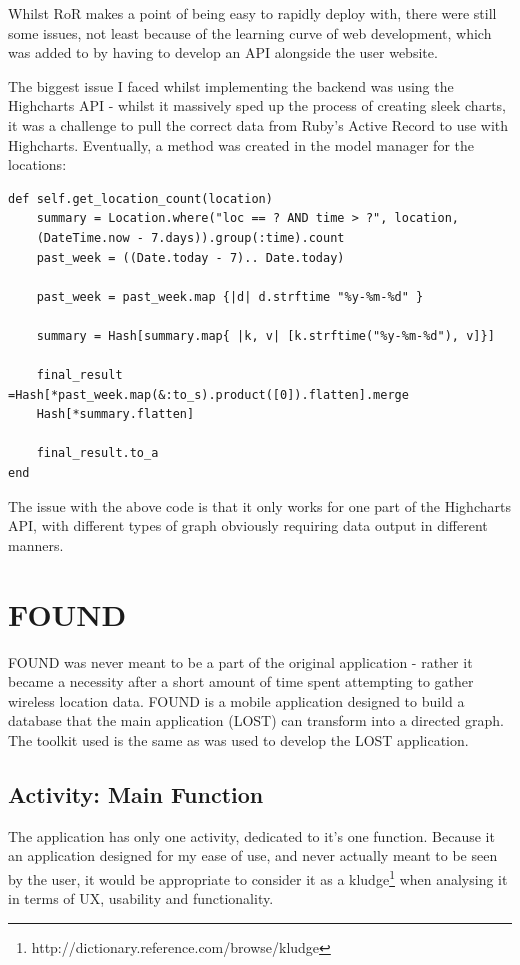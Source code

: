 \documentclass[11pt]{informatics-report}
\begin{document}
Whilst RoR makes a point of being easy to rapidly deploy with, there were still some issues, not least because of the learning curve of web development, which was added to by having to develop an API alongside the user website.

The biggest issue I faced whilst implementing the backend was using the Highcharts API - whilst it massively sped up the process of creating sleek charts, it was a challenge to pull the correct data from Ruby's Active Record to use with Highcharts. Eventually, a method was created in the model manager for the locations: 

\begin{verbatim}
def self.get_location_count(location)
	summary = Location.where("loc == ? AND time > ?", location, 
	(DateTime.now - 7.days)).group(:time).count
	past_week = ((Date.today - 7).. Date.today)

	past_week = past_week.map {|d| d.strftime "%y-%m-%d" }

	summary = Hash[summary.map{ |k, v| [k.strftime("%y-%m-%d"), v]}]

	final_result =Hash[*past_week.map(&:to_s).product([0]).flatten].merge 
	Hash[*summary.flatten]

	final_result.to_a
end
\end{verbatim}

The issue with the above code is that it only works for one part of the Highcharts API, with different types of graph obviously requiring data output in different manners. 

\section{FOUND}

FOUND was never meant to be a part of the original application - rather it became a necessity after a short amount of time spent attempting to gather wireless location data. FOUND is a mobile application designed to build a database that the main application (LOST) can transform into a directed graph. The toolkit used is the same as was used to develop the LOST application.

\subsection{Activity: Main Function}
The application has only one activity, dedicated to it's one function. Because it an application designed for my ease of use, and never actually meant to be seen by the user, it would be appropriate to consider it as a  kludge\footnote{http://dictionary.reference.com/browse/kludge} when analysing it in terms of UX, usability and functionality.
\end{document}
